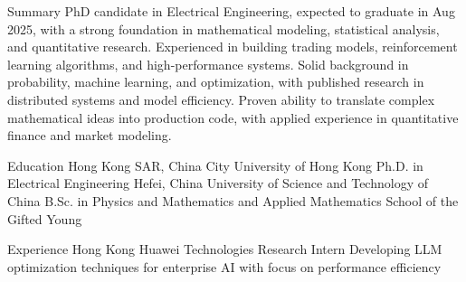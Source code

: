 \documentclass[caps, english]{financecv}
\begin{document}
\begin{cvsection}{Summary}
    PhD candidate in Electrical Engineering, expected to graduate in Aug 2025, with a strong foundation in mathematical modeling, statistical analysis, and quantitative research. Experienced in building trading models, reinforcement learning algorithms, and high-performance systems. Solid background in probability, machine learning, and optimization, with published research in distributed systems and model efficiency. Proven ability to translate complex mathematical ideas into production code, with applied experience in quantitative finance and market modeling.
\end{cvsection}

\begin{cvsection}{Education}
    {Hong Kong SAR, China}
    {City University of Hong Kong}
    {}
    {Ph.D. in Electrical Engineering}
    {}
    {}
    {}
    {Hefei, China}
    {University of Science and Technology of China}
    {}
    {B.Sc. in Physics and Mathematics and Applied Mathematics}
    {School of the Gifted Young}
    {}
    {}
\end{cvsection}

\begin{cvsection}{Experience}
    {Hong Kong}
    {Huawei Technologies}
    {Research Intern}
    {Developing LLM optimization techniques for enterprise AI with focus on performance efficiency}
    {}
    {}
    {}
\end{cvsection}
\end{document}
